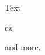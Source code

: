 \documentclass{article}
\begin{document}
Text \begin{IEEEeqnarrayboxm}{c}z\end{IEEEeqnarrayboxm} and more.
\end{document}
